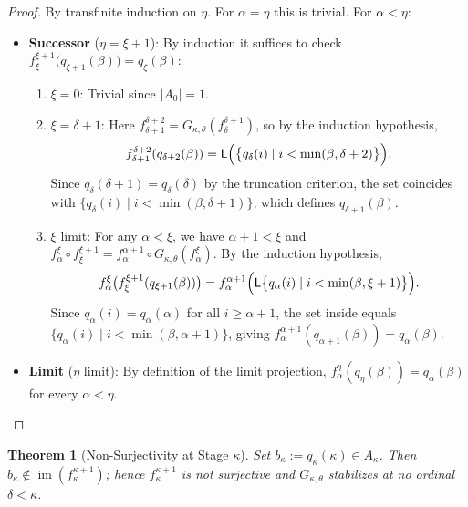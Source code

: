\documentclass[11pt,a4paper]{article}
\theoremstyle{definition}
\theoremstyle{plain}
\newtheorem{theorem}[definition]{Theorem}
\newcommand{\im}{\operatorname{im}}
\begin{document}
\begin{proof}
By transfinite induction on $\eta$. For $\alpha = \eta$ this is trivial. For $\alpha < \eta$:
\begin{itemize}[leftmargin=2em]
  \item \textbf{Successor} ($\eta = \xi + 1$): By induction it suffices to check $f_\xi^{\xi+1}\bigl(q_{\xi+1}(\beta)\bigr) = q_\xi(\beta)$:
    \begin{enumerate}[label=(\roman*)]
      \item $\xi = 0$: Trivial since $|A_0| = 1$.
      \item $\xi = \delta + 1$: Here $f_{\delta+1}^{\delta+2} = G_{\kappa,\theta}(f_\delta^{\delta+1})$, so by the induction hypothesis,
        \[
          f_{\delta+1}^{\delta+2}(q_{\delta+2}(\beta)) = \mathsf{L}\Bigl(\bigl\{ q_\delta(i) \mid i < \min(\beta, \delta+2) \bigr\}\Bigr).
        \]
        Since $q_\delta(\delta+1) = q_\delta(\delta)$ by the truncation criterion, the set coincides with $\{q_\delta(i) \mid i < \min(\beta, \delta+1)\}$, which defines $q_{\delta+1}(\beta)$.
      \item $\xi$ limit: For any $\alpha < \xi$, we have $\alpha + 1 < \xi$ and $f_\alpha^\xi \circ f_\xi^{\xi+1} = f_\alpha^{\alpha+1} \circ G_{\kappa,\theta}(f_\alpha^\xi)$. By the induction hypothesis,
        \[
          f_\alpha^\xi\bigl(f_\xi^{\xi+1}(q_{\xi+1}(\beta))\bigr) = f_\alpha^{\alpha+1}\Bigl(\mathsf{L}\bigl\{ q_\alpha(i) \mid i < \min(\beta, \xi+1) \bigr\}\Bigr).
        \]
        Since $q_\alpha(i) = q_\alpha(\alpha)$ for all $i \ge \alpha + 1$, the set inside equals $\{q_\alpha(i) \mid i < \min(\beta, \alpha+1)\}$, giving $f_\alpha^{\alpha+1}(q_{\alpha+1}(\beta)) = q_\alpha(\beta)$.
    \end{enumerate}
  \item \textbf{Limit} ($\eta$ limit): By definition of the limit projection, $f_\alpha^\eta(q_\eta(\beta)) = q_\alpha(\beta)$ for every $\alpha < \eta$. \qedhere
\end{itemize}
\end{proof}

\begin{theorem}[Non-Surjectivity at Stage $\kappa$]
Set $b_\kappa := q_\kappa(\kappa) \in A_\kappa$. Then $b_\kappa \notin \im(f_\kappa^{\kappa+1})$; hence $f_\kappa^{\kappa+1}$ is not surjective and $G_{\kappa,\theta}$ stabilizes at no ordinal $\delta < \kappa$.
\end{theorem}
\end{document}
